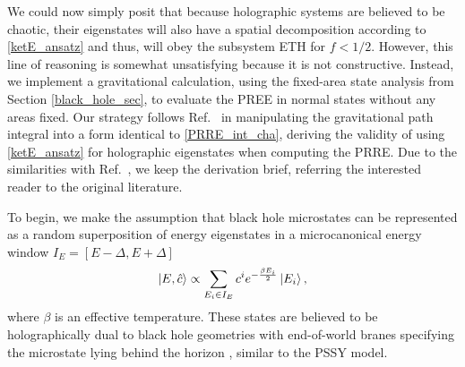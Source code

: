 \documentclass[a4paper,11pt]{article}
\newcommand*{\SR}[1]{\textcolor{magenta}{[SR: \textsf{#1}]}}
\begin{document}
We could now simply posit that because holographic systems are believed to be chaotic, their eigenstates will also have a spatial decomposition according to \eqref{ketE_ansatz} and thus, will obey the subsystem ETH 
for $f < 1/2$. However, this line of reasoning is somewhat unsatisfying because it is not constructive. 
Instead, we implement a gravitational calculation, using the fixed-area state analysis from Section \ref{black_hole_sec}, to evaluate the PREE in normal states without any areas fixed. Our strategy follows Ref.~\cite{2020JHEP...11..007D} in manipulating the gravitational path integral into a form identical to \eqref{PRRE_int_cha}, deriving the validity of using \eqref{ketE_ansatz} for holographic eigenstates when computing the PRRE.
Due to the similarities with Ref.~\cite{2020JHEP...11..007D}, we keep the derivation brief, referring the interested reader to the original literature.

To begin, we make the assumption that black hole microstates can be represented as a random superposition of energy eigenstates in a microcanonical energy window $I_E = [E- \Delta , E+ \Delta ]$
\begin{align}
    \ket{E,\hat{c}} \propto \sum_{E_i \in I_E }c^ie^{-\frac{\beta E_i}{2}} \ket{E_i},
\end{align}
where $\beta$ is an effective temperature. These states are believed to be holographically dual to black hole geometries with end-of-world branes specifying the microstate lying behind the horizon \cite{2013JHEP...05..014H,2017arXiv170702325K,2018arXiv180304434A,2019JHEP...07..065C,2021arXiv210306893M}, similar to the PSSY model. 
\end{document}
